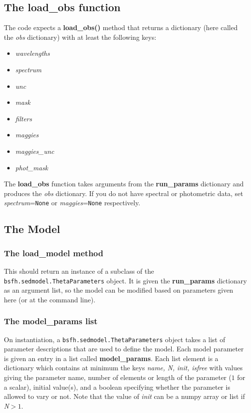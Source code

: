 \documentclass[12pt, letterpaper, preprint]{aastex}
\begin{document}
\subsection{The {\bf load\_obs} function}
The code expects a {\bf load\_obs()} method that returns a dictionary
(here called the {\it obs} dictionary) with at least the following
keys:
\begin{itemize}
\item {\it wavelengths}
\item {\it spectrum}
\item {\it unc}
\item {\it mask}
\item {\it filters}
\item {\it maggies}
\item {\it maggies\_unc}
\item {\it phot\_mask}
\end{itemize}

The {\bf load\_obs} function takes arguments from the {\bf run\_params}
dictionary and produces the {\it obs} dictionary.  If you do not have
spectral or photometric data, set {\it spectrum}=\texttt{None} or
{\it maggies}=\texttt{None} respectively.

\subsection{The Model}

\subsubsection{The {\bf load\_model} method}
This should return an instance of a subclass of the
\texttt{bsfh.sedmodel.ThetaParameters} object.  It is given the {\bf
run\_params} dictionary as an argument list, so the model can be
modified based on parameters given here (or at the command line).

\subsubsection{ The {\bf model\_params} list}
On instantiation, a \texttt{bsfh.sedmodel.ThetaParameters} object
takes a list of parameter descriptions that are used to define the
model.  Each model parameter is given an entry in a list called {\bf
model\_params}. Each list element is a dictionary which contains at
minimum the keys {\it name, N, init, isfree} with values giving the
parameter name, number of elements or length of the parameter
($1$ for a scalar), initial value(s), and a boolean specifying
whether the parameter is allowed to vary or not.  Note that the value
of {\it init} can be a numpy array or list if {\it N}$>1$.
\end{document}
